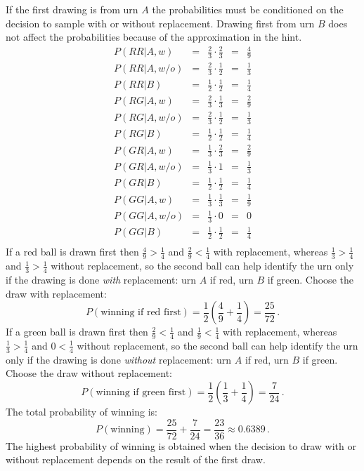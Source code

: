 If the first drawing is from urn $A$ the probabilities must be conditioned on the decision to sample with or without replacement. Drawing first from urn $B$ does not affect the probabilities because of the approximation in the hint.
\[
\renewcommand*{\arraystretch}{1.5}
\begin{array}{lcccc}
P(RR|A,w) &=& \frac{2}{3} \cdot \frac{2}{3} &=& \frac{4}{9}\\
P(RR|A,w/o) &=& \frac{2}{3} \cdot \frac{1}{2} &=& \frac{1}{3}\\
P(RR|B) &=& \frac{1}{2} \cdot \frac{1}{2} &=& \frac{1}{4}\\
\hline
P(RG|A,w) &=& \frac{2}{3} \cdot \frac{1}{3} &=& \frac{2}{9}\\
P(RG|A,w/o) &=& \frac{2}{3} \cdot \frac{1}{2} &=& \frac{1}{3}\\
P(RG|B) &=& \frac{1}{2} \cdot \frac{1}{2} &=& \frac{1}{4}\\
\hline
P(GR|A,w) &=& \frac{1}{3} \cdot \frac{2}{3} &=& \frac{2}{9}\\
P(GR|A,w/o) &=& \frac{1}{3} \cdot 1 &=& \frac{1}{3}\\
P(GR|B) &=& \frac{1}{2} \cdot \frac{1}{2} &=& \frac{1}{4}\\
\hline
P(GG|A,w) &=& \frac{1}{3} \cdot \frac{1}{3} &=& \frac{1}{9}\\
P(GG|A,w/o) &=& \frac{1}{3} \cdot 0 &=&0\\
P(GG|B) &=& \frac{1}{2} \cdot \frac{1}{2} &=& \frac{1}{4}\\\end{array}
\]
If a red ball is drawn first then $\frac{4}{9}>\frac{1}{4}$ and $\frac{2}{9}<\frac{1}{4}$ with replacement, whereas $\frac{1}{3}>\frac{1}{4}$ and $\frac{1}{3}>\frac{1}{4}$ without replacement, so the second ball can help identify the urn only if the drawing is done \emph{with} replacement: urn $A$ if red, urn $B$ if green. Choose the draw with replacement:
\[
P(\textrm{winning if red first})=\frac{1}{2}\left(\frac{4}{9}+\frac{1}{4}\right)=\frac{25}{72}\,.
\]
If a green ball is drawn first then $\frac{2}{9}<\frac{1}{4}$ and $\frac{1}{9}<\frac{1}{4}$ with replacement, whereas $\frac{1}{3}>\frac{1}{4}$ and $0<\frac{1}{4}$ without replacement, so the second ball can help identify the urn only if the drawing is done \emph{without} replacement: urn $A$ if red, urn $B$ if green. Choose the draw without replacement:
\[
P(\textrm{winning if green first})=\frac{1}{2}\left(\frac{1}{3}+\frac{1}{4}\right)=\frac{7}{24}\,.
\]
The total probability of winning is:
\[
P(\textrm{winning})=\frac{25}{72} + \frac{7}{24}=\frac{23}{36}\approx 0.6389\,.
\]
The highest probability of winning is obtained when the decision to draw with or without replacement depends on the result of the first draw.

